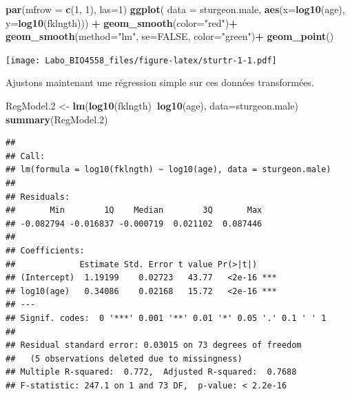 \documentclass[12pt,]{book}
\newenvironment{Shaded}{\begin{snugshade}}{\end{snugshade}}
\newcommand{\DataTypeTok}[1]{\textcolor[rgb]{0.27,0.27,0.27}{#1}}
\newcommand{\DecValTok}[1]{\textcolor[rgb]{0.06,0.06,0.06}{#1}}
\newcommand{\FloatTok}[1]{\textcolor[rgb]{0.06,0.06,0.06}{#1}}
\newcommand{\KeywordTok}[1]{\textcolor[rgb]{0.27,0.27,0.27}{\textbf{#1}}}
\newcommand{\NormalTok}[1]{#1}
\newcommand{\OperatorTok}[1]{\textcolor[rgb]{0.43,0.43,0.43}{\textbf{#1}}}
\newcommand{\OtherTok}[1]{\textcolor[rgb]{0.37,0.37,0.37}{#1}}
\newcommand{\StringTok}[1]{\textcolor[rgb]{0.5,0.5,0.5}{#1}}
\begin{document}
\begin{Shaded}
\begin{Highlighting}[]
\KeywordTok{par}\NormalTok{(}\DataTypeTok{mfrow =} \KeywordTok{c}\NormalTok{(}\DecValTok{1}\NormalTok{, }\DecValTok{1}\NormalTok{), }\DataTypeTok{las=}\DecValTok{1}\NormalTok{)}
\KeywordTok{ggplot}\NormalTok{(}
  \DataTypeTok{data =}\NormalTok{ sturgeon.male,}
  \KeywordTok{aes}\NormalTok{(}\DataTypeTok{x=}\KeywordTok{log10}\NormalTok{(age), }\DataTypeTok{y=}\KeywordTok{log10}\NormalTok{(fklngth))) }\OperatorTok{+}
\StringTok{  }\KeywordTok{geom_smooth}\NormalTok{(}\DataTypeTok{color=}\StringTok{"red"}\NormalTok{)}\OperatorTok{+}
\StringTok{  }\KeywordTok{geom_smooth}\NormalTok{(}\DataTypeTok{method=}\StringTok{"lm"}\NormalTok{, }\DataTypeTok{se=}\OtherTok{FALSE}\NormalTok{, }\DataTypeTok{color=}\StringTok{"green"}\NormalTok{)}\OperatorTok{+}
\StringTok{  }\KeywordTok{geom_point}\NormalTok{()}
\end{Highlighting}
\end{Shaded}

\texttt{[image: Labo\_BIO4558\_files/figure-latex/sturtr-1-1.pdf]}

Ajustons maintenant une régression simple sur ces données transformées.

\begin{Shaded}
\begin{Highlighting}[]
\NormalTok{RegModel}\FloatTok{.2}\NormalTok{ <-}\StringTok{ }\KeywordTok{lm}\NormalTok{(}\KeywordTok{log10}\NormalTok{(fklngth)}\OperatorTok{~}\KeywordTok{log10}\NormalTok{(age), }\DataTypeTok{data=}\NormalTok{sturgeon.male)}
\KeywordTok{summary}\NormalTok{(RegModel}\FloatTok{.2}\NormalTok{)}
\end{Highlighting}
\end{Shaded}

\begin{verbatim}
## 
## Call:
## lm(formula = log10(fklngth) ~ log10(age), data = sturgeon.male)
## 
## Residuals:
##       Min        1Q    Median        3Q       Max 
## -0.082794 -0.016837 -0.000719  0.021102  0.087446 
## 
## Coefficients:
##             Estimate Std. Error t value Pr(>|t|)    
## (Intercept)  1.19199    0.02723   43.77   <2e-16 ***
## log10(age)   0.34086    0.02168   15.72   <2e-16 ***
## ---
## Signif. codes:  0 '***' 0.001 '**' 0.01 '*' 0.05 '.' 0.1 ' ' 1
## 
## Residual standard error: 0.03015 on 73 degrees of freedom
##   (5 observations deleted due to missingness)
## Multiple R-squared:  0.772,	Adjusted R-squared:  0.7688 
## F-statistic: 247.1 on 1 and 73 DF,  p-value: < 2.2e-16
\end{verbatim}
\end{document}
